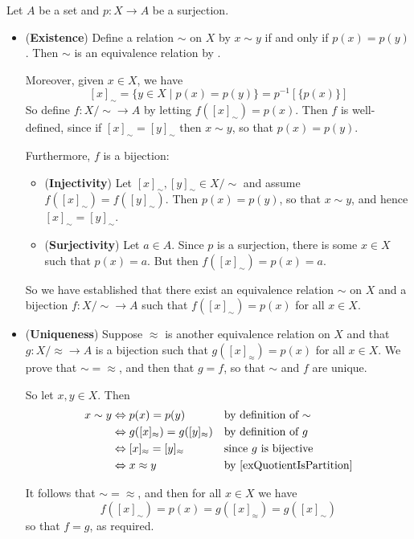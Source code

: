\begin{cproof}
Let $A$ be a set and $p : X \to A$ be a surjection.
\begin{itemize}
\item (\textbf{Existence}) Define a relation $\sim$ on $X$ by $x \sim y$ if and only if $p(x) = p(y)$. Then $\sim$ is an equivalence relation by .

Moreover, given $x \in X$, we have
\[ [x]_{\sim} = \{ y \in X \mid p(x) = p(y) \} = p^{-1}[\{p(x)\}] \]
So define $f : X/{\sim} \to A$ by letting $f([x]_{\sim}) = p(x)$. Then $f$ is well-defined, since if $[x]_{\sim} = [y]_{\sim}$ then $x \sim y$, so that $p(x)=p(y)$.

Furthermore, $f$ is a bijection:
\begin{itemize}
\item (\textbf{Injectivity}) Let $[x]_{\sim},[y]_{\sim} \in X/{\sim}$ and assume $f([x]_{\sim}) = f([y]_{\sim})$. Then $p(x)=p(y)$, so that $x \sim y$, and hence $[x]_{\sim} = [y]_{\sim}$.
\item (\textbf{Surjectivity}) Let $a \in A$. Since $p$ is a surjection, there is some $x \in X$ such that $p(x) = a$. But then $f([x]_{\sim}) = p(x) = a$.
\end{itemize}
So we have established that there exist an equivalence relation $\sim$ on $X$ and a bijection $f : X/{\sim} \to A$ such that $f([x]_{\sim}) = p(x)$ for all $x \in X$.

\item (\textbf{Uniqueness}) Suppose $\approx$ is another equivalence relation on $X$ and that $g : X/{\approx} \to A$ is a bijection such that $g([x]_{\approx}) = p(x)$ for all $x \in X$. We prove that ${\sim} = {\approx}$, and then that $g = f$, so that $\sim$ and $f$ are unique.

So let $x,y \in X$. Then
\begin{align*}
x \sim y
&\Leftrightarrow p(x) = p(y) && \text{by definition of $\sim$} \\
&\Leftrightarrow g([x]_{\approx}) = g([y]_{\approx}) && \text{by definition of $g$} \\
&\Leftrightarrow [x]_{\approx} = [y]_{\approx} && \text{since $g$ is bijective} \\
&\Leftrightarrow x \approx y && \text{by \Cref{exQuotientIsPartition}}
\end{align*}

It follows that ${\sim} = {\approx}$, and then for all $x \in X$ we have
\[ f([x]_{\sim}) = p(x) = g([x]_{\approx}) = g([x]_{\sim}) \]
so that $f=g$, as required.
\end{itemize}
\end{cproof}

